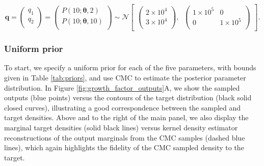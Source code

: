 \begin{equation}\label{eq:MM_outputDistribution}
\boldsymbol{q} =
\begin{pmatrix}
q_1\\
q_2\\
\end{pmatrix}
=
\begin{pmatrix}
P(10; \boldsymbol{\theta}, 2)\\
P(10; \boldsymbol{\theta}, 10)\\
\end{pmatrix} \sim  \mathcal{N}
\begin{bmatrix}
\begin{pmatrix}
2\times 10^4\\
3\times 10^4\\
\end{pmatrix}, \;\;
\begin{pmatrix}
1\times 10^5 & 0\\
0 & 1\times 10^5\\
\end{pmatrix}
\end{bmatrix}.
\end{equation}
%

\subsubsection{Uniform prior}\label{sec:growthmodel_uniform}
To start, we specify a uniform prior for each of the five parameters, with bounds given in Table \ref{tab:priors}, and use CMC to estimate the posterior parameter distribution. In Figure \ref{fig:growth_factor_outputs}A, we show the sampled outputs (blue points) versus the contours of the target distribution (black solid closed curves), illustrating a good correspondence between the sampled and target densities. Above and to the right of the main panel, we also display the marginal target densities (solid black lines) versus kernel density estimator reconstructions of the output marginals from the CMC samples (dashed blue lines), which again highlights the fidelity of the CMC sampled density to the target.

